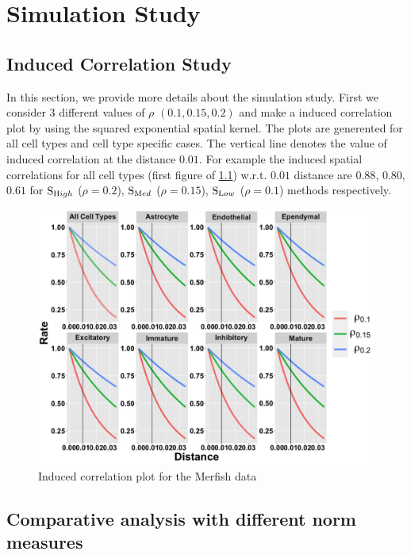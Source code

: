 \documentclass[
]{book}
\begin{document}
\hypertarget{simulation}{%
\chapter{Simulation Study}\label{simulation}}

\hypertarget{induced-correlation-study}{%
\section{Induced Correlation Study}\label{induced-correlation-study}}

In this section, we provide more details about the simulation study. First we consider \(3\) different values of \(\rho\) \((0.1,0.15,0.2)\) and make a induced correlation plot by using the squared exponential spatial kernel. The plots are generented for all cell types and cell type specific cases. The vertical line denotes the value of induced correlation at the distance \(0.01\). For example the induced spatial correlations for all cell types (first figure of \ref{fig:induceCORR}) w.r.t. \(0.01\) distance are \(0.88\), \(0.80\), \(0.61\) for \(\text S_{\text High}\) (\(\rho = 0.2\)), \(\text S_{\text Med}\) (\(\rho = 0.15\)), \(\text S_{\text Low}\) (\(\rho = 0.1\)) methods respectively.

\begin{figure}

{\centering \includegraphics[width=0.8\linewidth]{images/Merfish_induced_correlation_final} 

}

\caption{Induced correlation plot for the Merfish data}\label{fig:induceCORR}
\end{figure}

\hypertarget{comparative-analysis-with-different-norm-measures}{%
\section{Comparative analysis with different norm measures}\label{comparative-analysis-with-different-norm-measures}}
\end{document}
